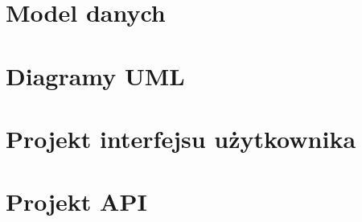 \section{Model danych}

\section{Diagramy UML}

\section{Projekt interfejsu użytkownika}

\section{Projekt API}
